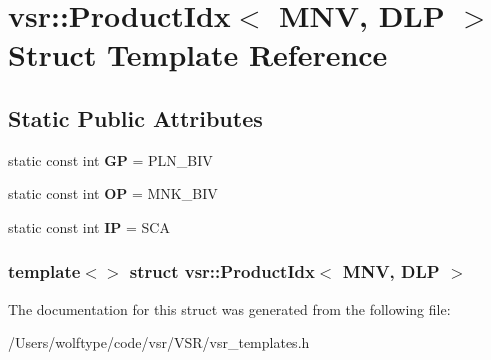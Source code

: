 \hypertarget{structvsr_1_1_product_idx_3_01_m_n_v_00_01_d_l_p_01_4}{\section{vsr\-:\-:Product\-Idx$<$ M\-N\-V, D\-L\-P $>$ Struct Template Reference}
\label{structvsr_1_1_product_idx_3_01_m_n_v_00_01_d_l_p_01_4}
}
\subsection*{Static Public Attributes}
\begin{DoxyCompactItemize}
\item 
\hypertarget{structvsr_1_1_product_idx_3_01_m_n_v_00_01_d_l_p_01_4_a7f6d0074c0c3c17674cd24ede332534c}{static const int {\bfseries G\-P} = P\-L\-N\-\_\-\-B\-I\-V}\label{structvsr_1_1_product_idx_3_01_m_n_v_00_01_d_l_p_01_4_a7f6d0074c0c3c17674cd24ede332534c}

\item 
\hypertarget{structvsr_1_1_product_idx_3_01_m_n_v_00_01_d_l_p_01_4_a54a96a6b43e3c7fe3955576748c69fcf}{static const int {\bfseries O\-P} = M\-N\-K\-\_\-\-B\-I\-V}\label{structvsr_1_1_product_idx_3_01_m_n_v_00_01_d_l_p_01_4_a54a96a6b43e3c7fe3955576748c69fcf}

\item 
\hypertarget{structvsr_1_1_product_idx_3_01_m_n_v_00_01_d_l_p_01_4_af2a4b0c9a641c5a68250c268d7e45f4b}{static const int {\bfseries I\-P} = S\-C\-A}\label{structvsr_1_1_product_idx_3_01_m_n_v_00_01_d_l_p_01_4_af2a4b0c9a641c5a68250c268d7e45f4b}

\end{DoxyCompactItemize}
\subsubsection*{template$<$$>$ struct vsr\-::\-Product\-Idx$<$ M\-N\-V, D\-L\-P $>$}



The documentation for this struct was generated from the following file\-:\begin{DoxyCompactItemize}
\item 
/\-Users/wolftype/code/vsr/\-V\-S\-R/vsr\-\_\-templates.\-h\end{DoxyCompactItemize}
